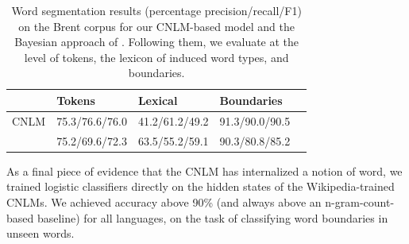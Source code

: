 

\begin{table}[t]
  \begin{center}
    \begin{tabular}{l|l|l|l|l}
      &Tokens & Lexical & Boundaries\\      \hline
	    CNLM & 75.3/76.6/76.0 & 41.2/61.2/49.2 & 91.3/90.0/90.5 \\
	    \citet{goldwater-bayesian-2009} & 75.2/69.6/72.3 & 63.5/55.2/59.1 & 90.3/80.8/85.2
    \end{tabular}
  \end{center}
	\caption{\label{tab:segmentation-results-brent} Word segmentation results (percentage precision/recall/F1)  on the Brent corpus for our CNLM-based model and the Bayesian approach of . Following them, we evaluate at the level of tokens, the lexicon of induced word types, and boundaries.}
\end{table}

As a final piece of evidence that the CNLM has internalized a notion
of word, we trained logistic classifiers directly on the hidden states
of the Wikipedia-trained CNLMs. We achieved accuracy above 90\% (and
always above an n-gram-count-based baseline) for all languages, on the
task of classifying word boundaries in unseen words.

